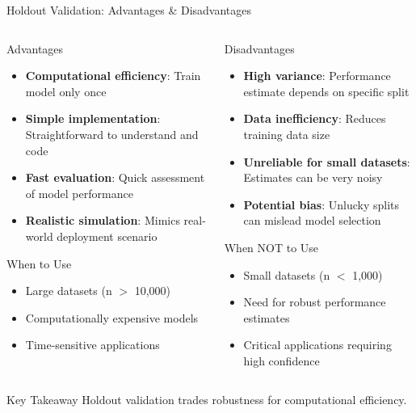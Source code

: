 \documentclass[8pt,aspectratio=1610]{beamer}
\begin{document}
\begin{frame}{Holdout Validation: Advantages \& Disadvantages}
\begin{columns}[t]
\begin{column}{0.48\textwidth}
\begin{block}{Advantages}
\begin{itemize}
\setlength{\itemsep}{3pt}
\item \textbf{Computational efficiency}: Train model only once
\item \textbf{Simple implementation}: Straightforward to understand and code
\item \textbf{Fast evaluation}: Quick assessment of model performance
\item \textbf{Realistic simulation}: Mimics real-world deployment scenario
\end{itemize}
\end{block}

\begin{block}{When to Use}
\begin{itemize}
\setlength{\itemsep}{2pt}
\item Large datasets (n $>$ 10,000)
\item Computationally expensive models
\item Time-sensitive applications
\end{itemize}
\end{block}
\end{column}

\begin{column}{0.48\textwidth}
\begin{block}{Disadvantages}
\begin{itemize}
\setlength{\itemsep}{3pt}
\item \textbf{High variance}: Performance estimate depends on specific split
\item \textbf{Data inefficiency}: Reduces training data size
\item \textbf{Unreliable for small datasets}: Estimates can be very noisy
\item \textbf{Potential bias}: Unlucky splits can mislead model selection
\end{itemize}
\end{block}

\begin{block}{When NOT to Use}
\begin{itemize}
\setlength{\itemsep}{2pt}
\item Small datasets (n $<$ 1,000)
\item Need for robust performance estimates
\item Critical applications requiring high confidence
\end{itemize}
\end{block}
\end{column}
\end{columns}

\begin{alertblock}{Key Takeaway}
Holdout validation trades robustness for computational efficiency.
\end{alertblock}
\end{frame}
\end{document}
